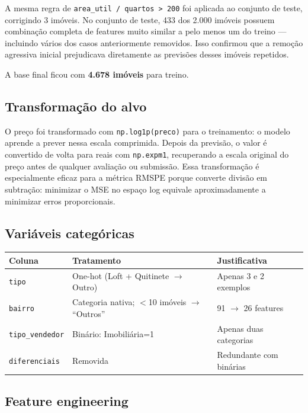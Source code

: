 \documentclass[12pt,a4paper]{article}
\begin{document}
A mesma regra de \lstinline{area_util / quartos > 200} foi aplicada ao conjunto de teste, corrigindo 3 imóveis. No conjunto de teste, 433 dos 2.000 imóveis possuem combinação completa de features muito similar a pelo menos um do treino --- incluindo vários dos casos anteriormente removidos. Isso confirmou que a remoção agressiva inicial prejudicava diretamente as previsões desses imóveis repetidos.

A base final ficou com \textbf{4.678 imóveis} para treino.

\subsection{Transformação do alvo}

O preço foi transformado com \lstinline{np.log1p(preco)} para o treinamento: o modelo aprende a prever nessa escala comprimida. Depois da previsão, o valor é convertido de volta para reais com \lstinline{np.expm1}, recuperando a escala original do preço antes de qualquer avaliação ou submissão. Essa transformação é especialmente eficaz para a métrica RMSPE porque converte divisão em subtração: minimizar o MSE no espaço log equivale aproximadamente a minimizar erros proporcionais.

\subsection{Variáveis categóricas}

\begin{table}[h]
\centering
\begin{tabular}{lll}
\toprule
\textbf{Coluna} & \textbf{Tratamento} & \textbf{Justificativa} \\
\midrule
\texttt{tipo}           & One-hot (Loft + Quitinete $\to$ Outro) & Apenas 3 e 2 exemplos \\
\texttt{bairro}         & Categoria nativa; $<$10 imóveis $\to$ ``Outros'' & 91 $\to$ 26 features \\
\texttt{tipo\_vendedor} & Binário: Imobiliária=1 & Apenas duas categorias \\
\texttt{diferenciais}   & Removida & Redundante com binárias \\
\bottomrule
\end{tabular}
\end{table}

\subsection{Feature engineering}
\end{document}
